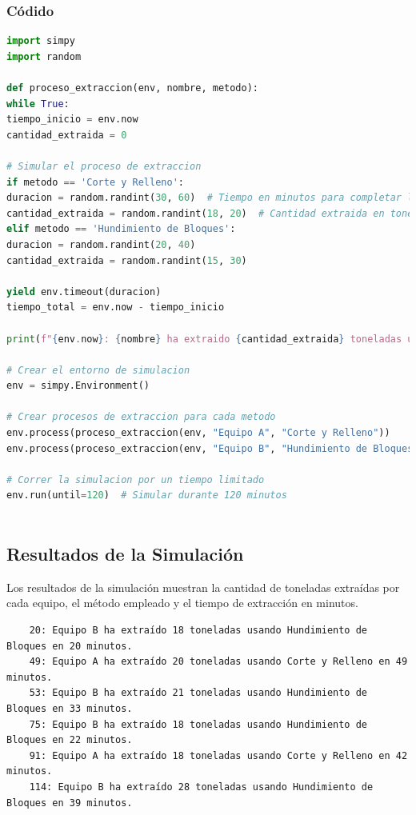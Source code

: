 \documentclass{article}
\begin{document}
\subsubsection*{Códido}
\begin{lstlisting}[language=Python, caption=Simulación de Procesos de Extracción, frame=single]
import simpy
import random

def proceso_extraccion(env, nombre, metodo):
while True:
tiempo_inicio = env.now
cantidad_extraida = 0

# Simular el proceso de extraccion
if metodo == 'Corte y Relleno':
duracion = random.randint(30, 60)  # Tiempo en minutos para completar la extraccion
cantidad_extraida = random.randint(18, 20)  # Cantidad extraida en toneladas
elif metodo == 'Hundimiento de Bloques':
duracion = random.randint(20, 40)
cantidad_extraida = random.randint(15, 30)

yield env.timeout(duracion)
tiempo_total = env.now - tiempo_inicio

print(f"{env.now}: {nombre} ha extraido {cantidad_extraida} toneladas usando {metodo} en {tiempo_total} minutos.")

# Crear el entorno de simulacion
env = simpy.Environment()

# Crear procesos de extraccion para cada metodo
env.process(proceso_extraccion(env, "Equipo A", "Corte y Relleno"))
env.process(proceso_extraccion(env, "Equipo B", "Hundimiento de Bloques"))

# Correr la simulacion por un tiempo limitado
env.run(until=120)  # Simular durante 120 minutos
	
\end{lstlisting}

\subsection*{Resultados de la Simulación}

Los resultados de la simulación muestran la cantidad de toneladas extraídas por cada equipo, el método empleado y el tiempo de extracción en minutos.

\begin{verbatim}
	20: Equipo B ha extraído 18 toneladas usando Hundimiento de Bloques en 20 minutos.
	49: Equipo A ha extraído 20 toneladas usando Corte y Relleno en 49 minutos.
	53: Equipo B ha extraído 21 toneladas usando Hundimiento de Bloques en 33 minutos.
	75: Equipo B ha extraído 18 toneladas usando Hundimiento de Bloques en 22 minutos.
	91: Equipo A ha extraído 18 toneladas usando Corte y Relleno en 42 minutos.
	114: Equipo B ha extraído 28 toneladas usando Hundimiento de Bloques en 39 minutos.
\end{verbatim}
\end{document}
